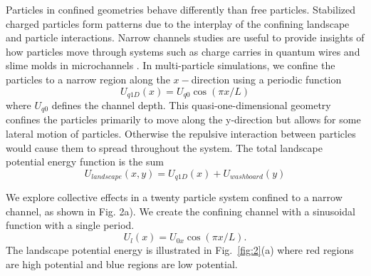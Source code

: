 \documentclass[twocolumn,preprintnumbers,amsmath,amssymb,aps,prx]{revtex4}
\begin{document}
Particles in confined geometries behave differently than free particles.
Stabilized charged particles form patterns
due to the interplay of the confining landscape 
and particle interactions.
Narrow channels studies are useful to provide insights 
of how particles move through systems 
such as charge carries in quantum wires \cite{Tarucha1995} and
slime molds in microchannels \cite{Gholami2015}.
 In multi-particle simulations, we confine
 the particles to a narrow region
 along the $x-$direction 
 using a periodic function 
 \begin{equation}
   U_{q1D}(x) = U_{q0} \cos{(\pi x / L)}
     \label{eq:xsubstrate}
 \end{equation}
 where $U_{q0}$ defines the channel depth.
 This 
 quasi-one-dimensional geometry
 confines the particles
 primarily to move 
 along the y-direction
 but allows for some lateral motion of particles.
 Otherwise the repulsive interaction between
 particles would cause them to spread throughout the system.
 The total landscape potential energy function is the sum
 \begin{equation}
   U_{landscape}(x,y) =  U_{q1D}(x) + U_{washboard}(y)
   \label{eq:xylandscape}
 \end{equation}

We explore collective effects in a 
twenty particle system confined to a narrow channel, as shown in Fig. 2a).  We create the confining channel with a sinusoidal function
with a single period.
\begin{equation}
  \label{eq:channel}
  U_l(x) = U_{0x} \cos{(\pi x/L)}.
\end{equation}
The landscape potential energy is illustrated in Fig.~\ref{fig:2}(a)
where red regions are high potential
and blue regions are low potential.
\end{document}
